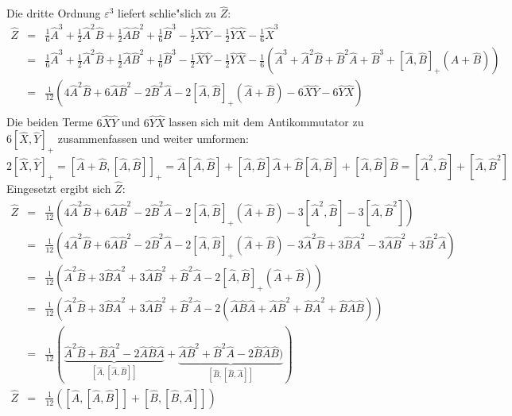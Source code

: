 \documentclass[10pt,a4paper]{article}
\begin{document}
Die dritte Ordnung $\varepsilon^3$ liefert schlie"slich zu $\hat{Z}$:
\begin{eqnarray*}
\hat{Z} & = & \frac{1}{6}\hat{A}^3 + \frac{1}{2}\hat{A}^2\hat{B} + \frac{1}{2}\hat{A}\hat{B}^2 + \frac{1}{6}\hat{B}^3 - \frac{1}{2}\hat{X}\hat{Y} - \frac{1}{2}\hat{Y}\hat{X} - \frac{1}{6}\hat{X}^3\\ & = & \frac{1}{6}\hat{A}^3 + \frac{1}{2}\hat{A}^2\hat{B} + \frac{1}{2}\hat{A}\hat{B}^2 + \frac{1}{6}\hat{B}^3 - \frac{1}{2}\hat{X}\hat{Y} - \frac{1}{2}\hat{Y}\hat{X} - \frac{1}{6}\left(\hat{A}^3 + \hat{A}^2\hat{B} + \hat{B}^2\hat{A} + \hat{B}^3 + [\hat{A},\hat{B}]_+(\hat{A} + \hat{B})\right)\\ & = & \frac{1}{12}\left(4\hat{A}^2\hat{B} + 6\hat{A}\hat{B}^2 - 2\hat{B}^2\hat{A} - 2[\hat{A},\hat{B}]_+(\hat{A} + \hat{B}) - 6\hat{X}\hat{Y} - 6\hat{Y}\hat{X}\right)\\
\end{eqnarray*}
Die beiden Terme $6\hat{X}\hat{Y}$ und $6\hat{Y}\hat{X}$ lassen sich mit dem Antikommutator zu $6[\hat{X},\hat{Y}]_+$ zusammenfassen und weiter umformen:
\[2[\hat{X},\hat{Y}]_+ = \left[\hat{A} + \hat{B}, [\hat{A},\hat{B}]\right]_+ = \hat{A}[\hat{A},\hat{B}] + [\hat{A},\hat{B}]\hat{A} + \hat{B}[\hat{A},\hat{B}] + [\hat{A},\hat{B}]\hat{B} = [\hat{A}^2,\hat{B}] + [\hat{A},\hat{B}^2]\]
Eingesetzt ergibt sich $\hat{Z}$:
\begin{eqnarray*}
\hat{Z} & = & \frac{1}{12}\left(4\hat{A}^2\hat{B} + 6\hat{A}\hat{B}^2 - 2\hat{B}^2\hat{A} - 2[\hat{A},\hat{B}]_+(\hat{A} + \hat{B}) - 3[\hat{A}^2,\hat{B}] - 3[\hat{A},\hat{B}^2]\right)\\& = & \frac{1}{12}\left(4\hat{A}^2\hat{B} + 6\hat{A}\hat{B}^2 - 2\hat{B}^2\hat{A} - 2[\hat{A},\hat{B}]_+(\hat{A} + \hat{B}) - 3\hat{A}^2\hat{B} + 3\hat{B}\hat{A}^2 - 3\hat{A}\hat{B}^2 + 3\hat{B}^2\hat{A} \right)\\ & = & \frac{1}{12}\left(\hat{A}^2\hat{B} + 3\hat{B}\hat{A}^2 + 3\hat{A}\hat{B}^2 + \hat{B}^2\hat{A} - 2[\hat{A},\hat{B}]_+(\hat{A} + \hat{B}) \right)\\ & = & \frac{1}{12}\left(\hat{A}^2\hat{B} + 3\hat{B}\hat{A}^2 + 3\hat{A}\hat{B}^2 + \hat{B}^2\hat{A} - 2(\hat{A}\hat{B}\hat{A} + \hat{A}\hat{B}^2 + \hat{B}\hat{A}^2 + \hat{B}\hat{A}\hat{B}) \right)\\ & = & \frac{1}{12}\left(\underbrace{\hat{A}^2\hat{B} + \hat{B}\hat{A}^2 - 2\hat{A}\hat{B}\hat{A}}_{\left[\hat{A},[\hat{A},\hat{B}]\right]} + \underbrace{\hat{A}\hat{B}^2 + \hat{B}^2\hat{A} - 2\hat{B}\hat{A}\hat{B})}_{\left[\hat{B},[\hat{B},\hat{A}]\right]} \right)\\ \hat{Z} & = & \frac{1}{12}\left(\left[\hat{A},[\hat{A},\hat{B}]\right] + \left[\hat{B},[\hat{B},\hat{A}]\right]\right)
\end{eqnarray*}
\end{document}

